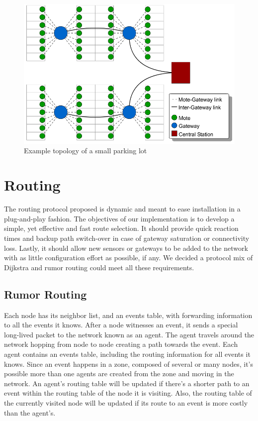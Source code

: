 \begin{figure}
    \centering
    \includegraphics[width=15cm]{images/Topology_General.png}
	\vspace{-1.5em}
    \caption{Example topology of a small parking lot}
    \vspace{-1.5em}
    \label{fig:topology}
\end{figure}

\section{Routing}
The routing protocol proposed is dynamic and meant to ease installation in a plug-and-play fashion. 
The objectives of our implementation is to develop a simple, yet effective and fast route selection. 
It should provide quick reaction times and backup path switch-over in case of gateway saturation or connectivity loss.
Lastly, it should allow new sensors or gateways to be added to the network with as little configuration effort as possible, if any.
We decided a protocol mix of Dijkstra and rumor routing could meet all these requirements.

\bigskip
\subsection{Rumor Routing}
Each node has its neighbor list, and an events table, with forwarding information to all the events it knows. 
After a node witnesses an event, it sends a special long-lived packet to the network known as an agent.
The agent travels around the network hopping from node to node creating a path towards the event.
Each agent contains an events table, including the routing information for all events it knows.
Since an event happens in a zone, composed of several or many nodes, it’s possible more than one agents are created from the zone and moving in the network.
 An agent's routing table will be updated if there’s a shorter path to an event within the routing table of the node it is visiting. 
Also, the routing table of the currently visited node will be updated if its route to an event is more costly than the agent’s. 

